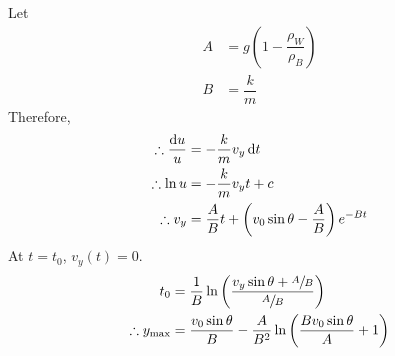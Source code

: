 \documentclass[fleqn, a4paper, 12pt]{amsart}
\theoremstyle{definition}
\theoremstyle{theorem}
\begin{document}
Let
\begin{align*}
	A &= g \left( 1 - \dfrac{\rho_W}{\rho_B} \right)\\
	B &= \dfrac{k}{m}
\end{align*}
Therefore,
\begin{align*}
	\therefore \dfrac{\dif u}{u} &= - \dfrac{k}{m} v_y \dif t\\
	\therefore \ln u &= - \dfrac{k}{m} v_y t + c\\
	\therefore v_y &= \dfrac{A}{B} t + \left( v_0 \sin \theta - \dfrac{A}{B} \right)e^{-Bt}
\end{align*}
At $t = t_0$, $v_y(t) = 0$.
\begin{align*}
	t_0 &= \dfrac{1}{B} \ln \left( \dfrac{v_y \sin \theta + \sfrac{A}{B}}{\sfrac{A}{B}} \right)\\
	\therefore y_{\textnormal{max}} &= \dfrac{v_0 \sin \theta}{B} - \dfrac{A}{B^2} \ln \left( \dfrac{B v_0 \sin \theta}{A} + 1 \right)
\end{align*}
\end{document}
